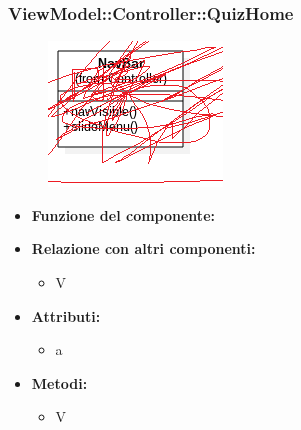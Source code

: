  \subsubsection{ViewModel::Controller::QuizHome}
 \begin{figure}[h!]
\begin{center}
	\includegraphics[scale=0.4]{../images/ViewModel/Controller/QuizHome.png}
\end{center}
\end{figure}
 \begin{itemize}
 \item\textbf{Funzione del componente:} 
 \item\textbf{Relazione con altri componenti:}
 \begin{itemize}
	\item V
 \end{itemize}
 \item\textbf{Attributi:}
 \begin{itemize}
	\item a
 \end{itemize}
 \item\textbf{Metodi:}
 	\begin{itemize}
\item V
 	\end{itemize}
 \end{itemize}
\newpage

